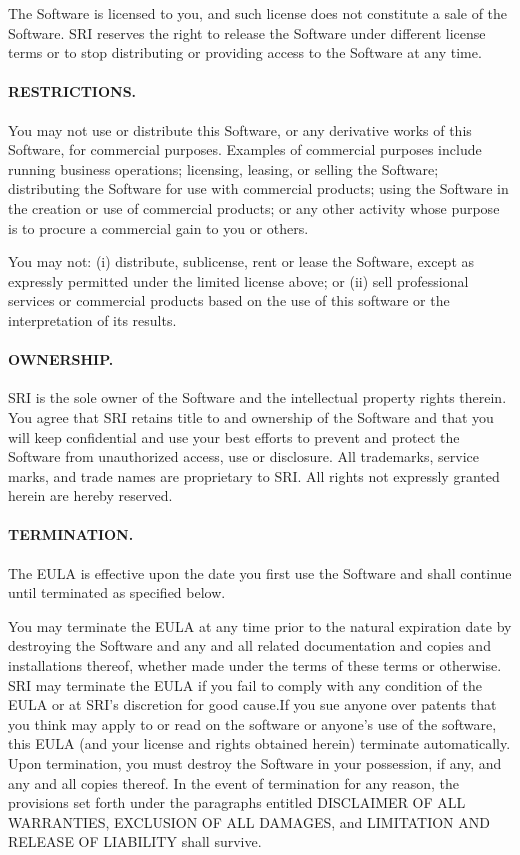 \documentclass[11pt,twoside,fleqn,openright,titlepage]{cslreport}
\begin{document}
\begin{small}
The Software is licensed to  you, and such license does not constitute
a  sale  of the  Software.   SRI reserves  the  right  to release  the
Software  under different  license terms  or to  stop  distributing or
providing access to the Software at any time.


\paragraph{RESTRICTIONS.}
You may not  use or distribute this Software, or  any derivative works
of  this Software,  for commercial  purposes.  Examples  of commercial
purposes include  running business operations; licensing,  leasing, or
selling  the   Software;  distributing  the  Software   for  use  with
commercial  products; using  the Software  in the  creation or  use of
commercial products; or any other activity whose purpose is to procure
a commercial gain to you or others.

You may not:  (i) distribute, sublicense, rent or  lease the Software,
except as expressly permitted under the limited license above; or (ii)
sell professional services or commercial  products based on the use of
this software or the interpretation of its results.


\paragraph{OWNERSHIP.}
SRI is  the sole owner of  the Software and  the intellectual property
rights therein.  You agree that  SRI retains title to and ownership of
the Software  and that  you will keep  confidential and use  your best
efforts to prevent and  protect the Software from unauthorized access,
use or disclosure.  All trademarks, service marks, and trade names are
proprietary  to SRI.   All  rights not  expressly  granted herein  are
hereby reserved.


\paragraph{TERMINATION.}
The EULA  is effective upon  the date you  first use the  Software and
shall continue until terminated as specified below.

You may terminate the EULA at any time prior to the natural expiration
date by destroying the Software  and any and all related documentation
and copies and installations thereof,  whether made under the terms of
these terms  or otherwise. SRI may  terminate the EULA if  you fail to
comply with any condition of the  EULA or at SRI's discretion for good
cause.If you  sue anyone over patents  that you think may  apply to or
read on the  software or anyone's use of the  software, this EULA (and
your  license  and rights  obtained  herein) terminate  automatically.
Upon termination, you must destroy the Software in your possession, if
any, and any  and all copies thereof. In the  event of termination for
any  reason, the provisions  set forth  under the  paragraphs entitled
DISCLAIMER OF ALL WARRANTIES, EXCLUSION OF ALL DAMAGES, and LIMITATION
AND RELEASE OF LIABILITY shall survive.



\end{small}
\end{document}
